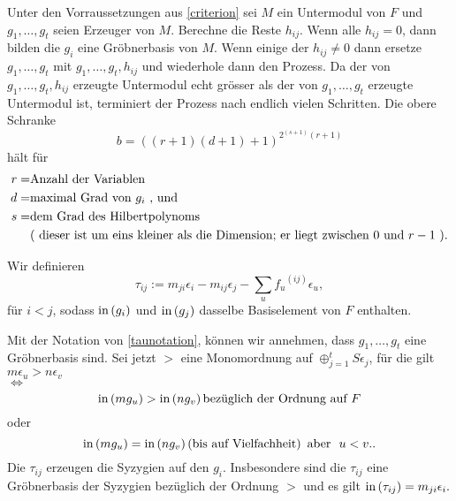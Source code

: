 \documentclass{article}
\begin{document}
\begin{algo}
	Unter den Vorraussetzungen aus \ref{criterion} 
	sei
	\( M \)
	ein Untermodul von
	\( F \)
	und 
	\( g_{1},\dots,g_{t}\)
	seien  Erzeuger von 
	\( M \).
	Berechne die Reste
	\( h_{ij} \).
	Wenn alle 
	\( h_{ij} = 0 \),
	dann bilden die 
	\(g_{i} \)
	eine Gr\"obnerbasis von 
	\( M \).
	Wenn einige der 
	\( h_{ij} \neq 0 \)
	dann ersetze 
	\( g_{1},\dots,g_{t}\)
	mit 
	\( g_{1},\dots,g_{t},h_{ij} \)
	und wiederhole dann den Prozess.
	Da der von
	\( g_{1},\dots,g_{t},h_{ij} \)
	erzeugte Untermodul echt gr\"osser als der von
	\( g_{1},\dots,g_{t}\)
	erzeugte Untermodul ist, 
	terminiert der Prozess nach endlich vielen Schritten.
	Die obere Schranke 
	\[
		b=\left( 
			\left( r+1 \right)
			\left( d+1 \right)+1 
		\right)^{2^{(s+1)}(r+1) }
	\]	
	h\"alt f\"ur
	\begin{align*}	
		r = &\text{Anzahl der Variablen} \\
		d = &\text{maximal Grad von \( g_i\) , und } \\
		s = &\text{dem Grad des Hilbertpolynoms } \\
		    &\text{( dieser ist um eins kleiner als die Dimension; 
		    er liegt zwischen \( 0 \) und \(r-1\) ).}
	\end{align*}

\end{algo}
        \begin{defn}
                Wir definieren
                \[
                        \tau_{ij}:=
                        m_{ji}\epsilon_{i} - 
                        m_{ij} \epsilon_{j} - 
                        \sum_{u} {f_{u}}^{\left( ij \right) } 
                        \epsilon_{u}, 
                \]
                f\"ur
                \( i < j \),
                sodass
                \( \operatorname{in} \left( g_{i}  \right) \)
                und
                \( \operatorname{in} \left( g_{j}  \right) \)
                dasselbe Basiselement von \( F \)
                enthalten.
        \end{defn}


\begin{thm}[Schreyer \cite{Eis1}[15.10]
	Mit der Notation von \ref{taunotation}, 
	k\"onnen wir annehmen,
	dass
	\( g_1,\dots,g_t\)
	eine Gr\"obnerbasis sind.
	Sei jetzt 
	\( > \) 
	eine Monomordnung auf 
	\( \oplus_{j=1}^t S \epsilon_{j} \),
	f\"ur die gilt
	\( m \epsilon_{u} > n \epsilon_{v} \) \\
	\(\iff\)
	\[
		\operatorname{in}\left(  m g_{u} \right) > \operatorname{in}\left( n g_{v} \right) 
		\text{bez\"uglich der Ordnung auf } F 
	\]
	oder
	\[
		\operatorname{in}\left( m g_{u} \right) = \operatorname{in}\left( n g_{v} \right) 
		\left( \text{bis auf Vielfachheit} \right) \text{\ aber \ } u < v.
	.\]
	Die
	\( \tau_{ij} \) 
	erzeugen die Syzygien auf den
	\( g_{i} \).
	Insbesondere sind die
	\( \tau_{ij} \)
	eine Gr\"obnerbasis der Syzygien bez\"uglich der Ordnung
	\( > \)
	und es gilt
	\( \operatorname{in}\left( \tau_{ij} \right) = m_{ji}\epsilon_{i}.\)
\end{thm}


\end{document}
